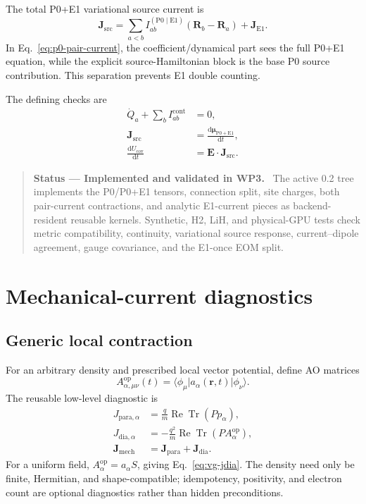 \documentclass[11pt]{article}
\newcommand{\dd}{\mathrm{d}}
\newcommand{\Pzero}{\mathrm{P0}}
\newcommand{\Eone}{\mathrm{E1}}
\newcommand{\ReTr}{\operatorname{Re}\operatorname{Tr}}
\newcommand{\vect}[1]{\bm{#1}}
\newenvironment{statusbox}[1]
  {\begin{quote}\small\textbf{Status --- #1.}\ }
  {\end{quote}}
\begin{document}
The total P0+E1 variational source current is
\begin{equation}
 \vect J_{\mathrm{src}}
 =\sum_{a<b}I_{ab}^{(\Pzero\mid\Eone)}
  (\vect R_b-\vect R_a)+\vect J_{\Eone}.
 \label{eq:source-current}
\end{equation}
In Eq.~\eqref{eq:p0-pair-current}, the coefficient/dynamical part sees the
full P0+E1 equation, while the explicit source-Hamiltonian block is the base
P0 source contribution. This separation prevents E1 double counting.

The defining checks are
\begin{align}
 \dot Q_a+\sum_b I_{ab}^{\mathrm{cont}}&=0,\label{eq:cov-continuity}\\
 \vect J_{\mathrm{src}}
   &=\frac{\dd\vect\mu_{\Pzero+\Eone}}{\dd t},\label{eq:j-mu}\\
 \frac{\dd U_{\mathrm{cov}}}{\dd t}
   &=\vect E\cdot\vect J_{\mathrm{src}}.
 \label{eq:cov-ward}
\end{align}

\begin{statusbox}{Implemented and validated in WP3}
The active 0.2 tree implements the P0/P0+E1 tensors, connection split, site
charges, both pair-current contractions, and analytic E1-current pieces as
backend-resident reusable kernels. Synthetic, H2, LiH, and physical-GPU tests
check metric compatibility, continuity, variational source response,
current--dipole agreement, gauge covariance, and the E1-once EOM split.
\end{statusbox}

\section{Mechanical-current diagnostics}

\subsection{Generic local contraction}

For an arbitrary density and prescribed local vector potential, define AO
matrices
\begin{equation}
 A^{\mathrm{op}}_{\alpha,\mu\nu}(t)
 =\langle\phi_\mu\vert
 a_\alpha(\vect r,t)\vert\phi_\nu\rangle.
\end{equation}
The reusable low-level diagnostic is
\begin{align}
 J_{\mathrm{para},\alpha}
   &=\frac q m\ReTr(Pp_\alpha),\label{eq:generic-jpara}\\
 J_{\mathrm{dia},\alpha}
   &=-\frac{q^2}{m}\ReTr(PA^{\mathrm{op}}_\alpha),
     \label{eq:generic-jdia}\\
 \vect J_{\mathrm{mech}}
   &=\vect J_{\mathrm{para}}+\vect J_{\mathrm{dia}}.
 \label{eq:generic-jmech}
\end{align}
For a uniform field,
\(A^{\mathrm{op}}_\alpha=a_\alpha S\), giving
Eq.~\eqref{eq:vg-jdia}. The density need only be finite, Hermitian, and
shape-compatible; idempotency, positivity, and electron count are optional
diagnostics rather than hidden preconditions.
\end{document}
